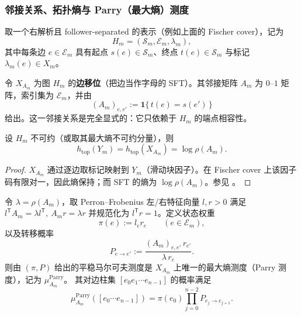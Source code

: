 \subsubsection{邻接关系、拓扑熵与 Parry（最大熵）测度}\label{subsubsec:Ym-adjacency-entropy-parry}
取一个右解析且 follower-separated 的表示（例如上面的 Fischer cover），记为
\[
H_m=(\mathcal{S}_m,\mathcal{E}_m,\lambda_m),
\]
其中每条边 $e\in\mathcal{E}_m$ 具有起点 $s(e)\in\mathcal{S}_m$、终点 $t(e)\in\mathcal{S}_m$ 与标记 $\lambda_m(e)\in X_m$。

\begin{definition}\label{def:Phi_m-adjacency}
令 $X_{A_m}$ 为图 $H_m$ 的\textbf{边移位}（把边当作字母的 SFT）。其邻接矩阵 $A_m$ 为 $0$--$1$ 矩阵，索引集为 $\mathcal{E}_m$，并由
\[
(A_m)_{e,e'}:=\mathbf{1}\{\,t(e)=s(e')\,\}
\]
给出。这一邻接关系是完全显式的：它只依赖于 $H_m$ 的端点相容性。
\end{definition}

\begin{proposition}[拓扑熵的可计算公式]\label{prop:Phi_m-entropy}
设 $H_m$ 不可约（或取其最大熵不可约分量），则
\[
h_{\mathrm{top}}(Y_m)=h_{\mathrm{top}}(X_{A_m})=\log\rho(A_m).
\]
\end{proposition}

\begin{proof}
$X_{A_m}$ 通过逐边取标记映射到 $Y_m$（滑动块因子）。在 Fischer cover 上该因子码有限对一，因此熵保持；而 SFT 的熵为 $\log\rho(A_m)$。参见 \cite{LindMarcus1995,Kitchens1998SymbolicDynamics}。
\end{proof}

\begin{proposition}\label{prop:Phi_m-parry}
令 $\lambda=\rho(A_m)$，取 Perron--Frobenius 左/右特征向量 $l,r>0$ 满足
\(
l^{\mathsf T}A_m=\lambda l^{\mathsf T},\ A_m r=\lambda r
\)
并规范化为 $l^{\mathsf T}r=1$。定义状态权重
\[
\pi(e):=l_e r_e\qquad (e\in\mathcal{E}_m),
\]
以及转移概率
\[
P_{e\to e'}:=\frac{(A_m)_{e,e'}\,r_{e'}}{\lambda\, r_e}.
\]
则由 $(\pi,P)$ 给出的平稳马尔可夫测度是 $X_{A_m}$ 上唯一的最大熵测度（Parry 测度），记为 $\mu_{A_m}^{\mathrm{Parry}}$。
其对边柱集 $[e_0e_1\cdots e_{n-1}]$ 的概率满足
\[
\mu_{A_m}^{\mathrm{Parry}}([e_0\cdots e_{n-1}])=\pi(e_0)\prod_{j=0}^{n-2} P_{e_j\to e_{j+1}}.
\]
\end{proposition}


